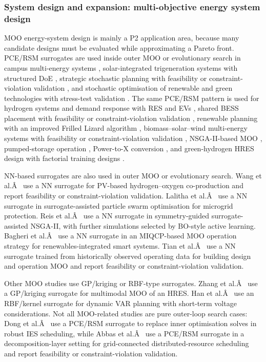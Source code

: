 \documentclass[final,5p,times,twocolumn]{elsarticle}
\begin{document}
\subsubsection{System design and expansion: multi-objective energy system design}
\label{sec:apps:moo}

MOO energy-system design is mainly a P2 application area, because many
candidate designs must be evaluated while approximating a Pareto front.
PCE/RSM surrogates are used inside outer MOO or evolutionary search in
campus multi-energy systems \cite{Dong2024}, solar-integrated trigeneration
systems with structured DoE \cite{Salahinezhad2025}, strategic stochastic
planning with feasibility or constraint-violation validation
\cite{alahmad_enhancing_2025}, and stochastic optimisation of renewable and
green technologies with stress-test validation
\cite{alahmad_optimizing_2025}. The same PCE/RSM pattern is used for
hydrogen systems and demand response with RES and EVs
\cite{ali_optimizing_2025}, shared BESS placement with feasibility or
constraint-violation validation \cite{an_multi-objective_2025}, renewable
planning with an improved Frilled Lizard algorithm
\cite{bendriss_novel_2025}, biomass--solar--wind multi-energy systems with
feasibility or constraint-violation validation
\cite{chen_multi-objective_2025-1}, NSGA-II-based MOO
\cite{cortes-caicedo_multi-objective_2025}, pumped-storage operation
\cite{liang_high_2024}, Power-to-X conversion \cite{malla_sg_optimization_2024},
and green-hydrogen HRES design with factorial training designs
\cite{tezer_multi-objective_2025}.

NN-based surrogates are also used in outer MOO or evolutionary search.
Wang et al.Â~\cite{Wang2024} use a NN surrogate for PV-based hydrogen--oxygen
co-production and report feasibility or constraint-violation validation.
Lalitha et al.Â~\cite{Lalitha20231401} use a NN surrogate in
surrogate-assisted particle swarm optimisation for microgrid protection.
Reis et al.Â~\cite{Reis2025} use a NN surrogate in symmetry-guided
surrogate-assisted NSGA-II, with further simulations selected by
BO-style active learning. Bagheri et al.Â~\cite{bagheri_miqcp-based_2025} use
a NN surrogate in an MIQCP-based MOO operation strategy for
renewables-integrated smart systems. Tian et al.Â~\cite{tian_building_2025}
use a NN surrogate trained from historically observed operating data for
building design and operation MOO and report feasibility or
constraint-violation validation.

Other MOO studies use GP/kriging or RBF-type surrogates. Zhang et
al.Â~\cite{Zhang20234075} use a GP/kriging surrogate for multimodal MOO of an
HRES. Han et al.Â~\cite{Han2018622} use an RBF/kernel surrogate for dynamic
VAR planning with short-term voltage considerations. Not all MOO-related
studies are pure outer-loop search cases: Dong et al.Â~\cite{Dong2023__2} use
a PCE/RSM surrogate to replace inner optimisation solves in robust IES
scheduling, while Abbas et al.Â~\cite{abbas_optimal_2024} use a PCE/RSM
surrogate in a decomposition-layer setting for grid-connected
distributed-resource scheduling and report feasibility or
constraint-violation validation.
\end{document}
